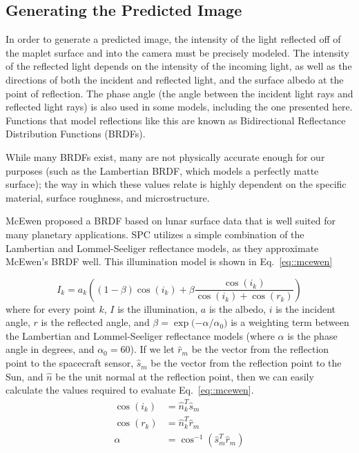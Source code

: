 \documentclass{RPI-SIW}
\begin{document}
\subsection*{Generating the Predicted Image}
In order to generate a predicted image, the intensity of the light reflected off of the maplet surface and into the camera must be precisely modeled.  The intensity of the reflected light depends on the intensity of the incoming light, as well as the directions of both the incident and reflected light, and the surface albedo at the point of reflection.  The phase angle (the angle between the incident light rays and reflected light rays) is also used in some models, including the one presented here.  Functions that model reflections like this are known as Bidirectional Reflectance Distribution Functions (BRDFs).

While many BRDFs exist, many are not physically accurate enough for our purposes (such as the Lambertian BRDF, which models a perfectly matte surface); the way in which these values relate is highly dependent on the specific material, surface roughness, and microstructure.

McEwen proposed a BRDF based on lunar surface data that is well suited for many planetary applications.\cite{mcewen}  SPC utilizes a simple combination of the Lambertian and Lommel-Seeliger reflectance models, as they approximate McEwen's BRDF well.\cite{gaskell_nav_overview}  This illumination model is shown in Eq.~\eqref{eq::mcewen}

\begin{equation}
	\label{eq::mcewen}
	I_k = a_k \left((1-\beta)\cos{(i_k)} + \beta \frac{\cos{(i_k)}}{\cos{(i_k)} + \cos{(r_k)}}\right)
\end{equation}
where for every point $k$, $I$ is the illumination, $a$ is the albedo, $i$ is the incident angle, $r$ is the reflected angle, and $\beta = \exp{(-\alpha/\alpha_0})$ is a weighting term between the Lambertian and Lommel-Seeliger reflectance models (where $\alpha$ is the phase angle in degrees, and $\alpha_0 = 60$).  If we let $\hat{r}_m$ be the vector from the reflection point to the spacecraft sensor, $\hat{s}_m$ be the vector from the reflection point to the Sun, and $\hat{n}$ be the unit normal at the reflection point, then we can easily calculate the values required to evaluate Eq.~\eqref{eq::mcewen}.
\begin{align*}
	\cos{(i_k)} &= \hat{n}_k^T \hat{s}_m \\
	\cos{(r_k)} &= \hat{n}_k^T \hat{r}_m \\
	\alpha &= \cos^{-1}{\left(\hat{s}_m^T \hat{r}_m \right)}
\end{align*}
\end{document}
